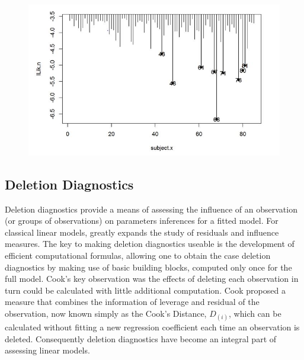 \documentclass[]{report}
\begin{document}
	
	
	
	
	\begin{figure}[h!]
		\centering
		\includegraphics[width=0.7\linewidth]{images/LogLik-JS-Roy}
		\caption{}
		\label{fig:LogLik-JS-Roy}
	\end{figure}
	
	
	
\subsection{Deletion Diagnostics}
	
	
	
	Deletion diagnostics provide a means of assessing the influence of an observation (or groups of observations) on parameters inferences for a fitted model. For classical linear models, \citet{cook77} greatly expands the study of residuals and influence measures. The key to making deletion diagnostics useable is the development of efficient computational formulas, allowing one to obtain the  case deletion diagnostics by making use of basic building blocks, computed only once for the full model.
	Cook's key observation was the effects of deleting each observation in turn could be calculated with little additional computation. Cook proposed a measure that combines the information of leverage and residual of the observation, now known simply as the Cook's Distance, $D_{(i)}$, which can be calculated without fitting a new regression coefficient each time an observation is deleted. Consequently deletion diagnostics have become an integral part of assessing linear models.
	
\end{document}
